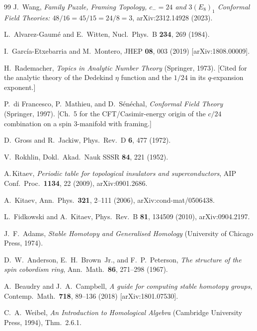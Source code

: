 \documentclass[aps,prl,twocolumn,superscriptaddress]{revtex4-2}
\begin{document}
\begin{thebibliography}{99}
J.~Wang, \emph{Family Puzzle, Framing Topology, $c_-=24$ and $3(E_8)_1$
Conformal Field Theories: $48/16 = 45/15 = 24/8 = 3$}, arXiv:2312.14928 (2023).

L.~Alvarez-Gaum\'e and E.~Witten,
Nucl.\ Phys.\ B \textbf{234}, 269 (1984).

I.~Garc\'ia-Etxebarria and M.~Montero,
JHEP \textbf{08}, 003 (2019) [arXiv:1808.00009].

H.~Rademacher, \emph{Topics in Analytic Number Theory}
(Springer, 1973). [Cited for the analytic theory of the
Dedekind $\eta$ function and the $1/24$ in its $q$-expansion exponent.]

P.~di Francesco, P.~Mathieu, and D.~S\'en\'echal,
\emph{Conformal Field Theory} (Springer, 1997).
[Ch.~5 for the CFT/Casimir-energy origin of the $c/24$
combination on a spin 3-manifold with framing.]

D.~Gross and R.~Jackiw,
Phys.\ Rev.\ D \textbf{6}, 477 (1972).

V.~Rokhlin, Dokl.\ Akad.\ Nauk SSSR \textbf{84}, 221 (1952).

A.\,Kitaev,
\textit{Periodic table for topological insulators and superconductors},
AIP Conf.\ Proc.\ \textbf{1134}, 22 (2009), arXiv:0901.2686.

A.~Kitaev,
Ann.\ Phys.\ \textbf{321}, 2--111 (2006), arXiv:cond-mat/0506438.

L.~Fidkowski and A.~Kitaev,
Phys.\ Rev.\ B \textbf{81}, 134509 (2010), arXiv:0904.2197.

J.~F.~Adams, \emph{Stable Homotopy and Generalised Homology}
(University of Chicago Press, 1974).

D.~W.~Anderson, E.~H.~Brown~Jr., and F.~P.~Peterson,
\emph{The structure of the spin cobordism ring},
Ann.\ Math.\ \textbf{86}, 271--298 (1967).

A.~Beaudry and J.~A.~Campbell,
\emph{A guide for computing stable homotopy groups},
Contemp.\ Math.\ \textbf{718}, 89--136 (2018) [arXiv:1801.07530].

C.~A.~Weibel, \emph{An Introduction to Homological Algebra}
(Cambridge University Press, 1994), Thm.~2.6.1.
\end{thebibliography}
\end{document}
